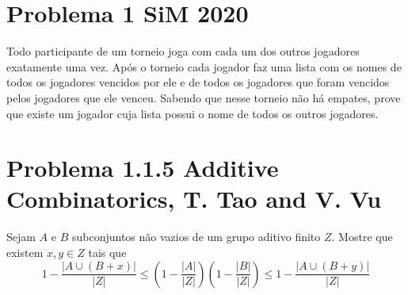 \section{Problema 1 SiM 2020}

Todo participante de um torneio joga com cada um dos outros jogadores exatamente uma vez. Após o torneio cada jogador faz uma lista com os nomes de todos os jogadores vencidos por ele e de todos os jogadores que foram vencidos pelos jogadores que ele venceu. Sabendo que nesse torneio não há empates, prove que existe um jogador cuja lista possui o nome de todos os outros jogadores.

\section{Problema 1.1.5 Additive Combinatorics, T. Tao and V. Vu}

Sejam $A$ e $B$ subconjuntos não vazios de um grupo aditivo finito $Z$. Mostre que existem $x,y\in Z$ tais que
$$1-\frac{|A\cup (B+x)|}{|Z|}\le \left(1-\frac{|A|}{|Z|}\right) \left(1-\frac{|B|}{|Z|}\right)\le 1-\frac{|A\cup (B+y)|}{|Z|}$$